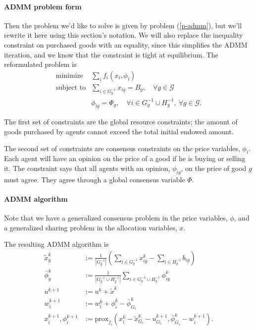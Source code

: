 \documentclass[12pt]{article}
\begin{document}
\paragraph{ADMM problem form} Then the problem we'd like to solve is given by
problem (\ref{p-admm}), but we'll rewrite it here using this section's notation.
We will also replace the inequality constraint on purchased goods with an
equality, since this simplifies the ADMM iteration, and we know that
the constraint is tight at equilibrium.
The reformulated problem is
\[
\begin{array}{ll}
\mbox{minimize} & \sum_i f_i(x_i, \phi_i) \\
\mbox{subject to} & \sum\limits_{i \in G^{-1}_g} x_{ig} = B_g,\quad \forall g \in \mathcal{G}\\
& \phi_{ig} = \Phi_g,\quad \forall i \in G^{-1}_g \cup H^{-1}_g,\ \forall g \in \mathcal{G}.
\end{array}
\]

The first set of constraints are the global resource constraints; the amount of
goods purchased by agents cannot exceed the total initial endowed amount.

The second set of constraints are consensus constraints on the price variables,
$\phi_i$.
Each agent will have an opinion on the price of a good if he is buying or selling it.
The constraint says that all agents with an opinion, $\phi_{ig}$, on the price
of good $g$ must agree.
They agree through a global consensus variable $\Phi$.


\paragraph{ADMM algorithm}
Note that we have a generalized consensus problem in the price variables,
$\phi$, and a generalized sharing problem in the allocation variables, $x$.

The resulting ADMM algorithm is 
\begin{align}
\label{a-xtild}
\tilde{x}^k_g &:= \frac{1}{|G^{-1}_g|} \left( \sum_{i \in G^{-1}_g} x^k_{ig} - \sum_{i \in H^{-1}_g} b_{ig}\right)\\
\label{a-phibar}
\bar{\phi}^k_g &:= \frac{1}{ |G^{-1}_g \cup H^{-1}_g| } \sum_{i \in G^{-1}_g \cup H^{-1}_g}\phi^k_{ig}\\
u^{k+1} &:= u^k + \tilde{x}^k\\
w_i^{k+1} &:= w_i^k + \phi^k_i - \bar{\phi}^k_{G_i}\\
\label{a-prox}
x_i^{k+1}, \phi_i^{k+1} &:= \mbox{prox}_{f_i}(x_i^k - \tilde{x}^k_{G_i} - u^{k+1}_{G_i},
\bar{\phi}^k_{G_i} - w_i^{k+1}).
\end{align}
\end{document}
